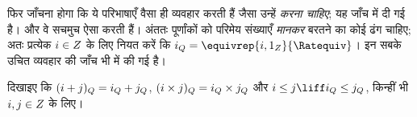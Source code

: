 \documentclass[../../../include/open-logic-section]{subfiles}
\begin{document}
फिर जाँचना होगा कि ये परिभाषाएँ वैसा ही व्यवहार करती हैं जैसा उन्हें
\emph{करना चाहिए}; यह जाँच  में दी गई है। और वे सचमुच ऐसा
करती हैं। अंततः पूर्णांकों को परिमेय संख्याएँ \emph{मानकर} बरतने का कोई ढंग
चाहिए; अतः प्रत्येक $i \in Z$ के लिए नियत करें कि $i_\Rat =
\equivrep{i, 1_\Int}{\Ratequiv}$। इन सबके उचित व्यवहार की जाँच भी
 में की गई है।

\begin{prob}
दिखाइए कि $(i + j)_Q = i_Q+ j_Q$, $(i \times j)_Q =
i_Q \times j_Q$ और $i \leq j \liff i_\Rat \leq j_\Rat$, किन्हीं
भी $i, j \in Z$ के लिए।
\end{prob}
\end{document}
